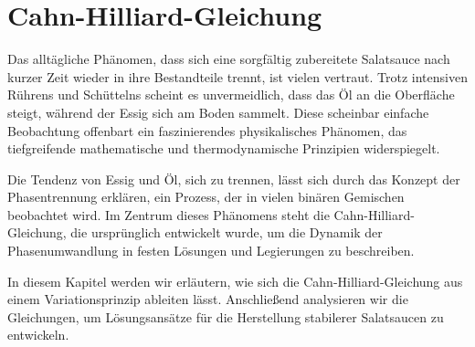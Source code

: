 %
%
%
%
\newcommand{\di}[2][]{\,\dd[#1]{#2}}
\newcommand{\deriv}[3][]{\frac{\dd[#1]{#2}}{\dd[]{#3^{#1}}}}
\newcommand{\pderiv}[3][]{\frac{\partial^{#1} #2}{\partial #3^{#1}}}
\newcommand{\energy}{\mathcal{E}}
\newcommand{\flux}{\mathcal{J}}

\chapter{Cahn-Hilliard-Gleichung\label{chapter:cahnhilliard}}
\begin{refsection}

Das alltägliche Phänomen,
dass sich eine sorgfältig zubereitete Salatsauce
nach kurzer Zeit wieder in ihre Bestandteile trennt,
ist vielen vertraut.
Trotz intensiven Rührens und Schüttelns scheint es unvermeidlich,
dass das Öl an die Oberfläche steigt,
während der Essig sich am Boden sammelt.
Diese scheinbar einfache Beobachtung offenbart ein faszinierendes physikalisches Phänomen,
das tiefgreifende mathematische und thermodynamische Prinzipien widerspiegelt.

Die Tendenz von Essig und Öl,
sich zu trennen,
lässt sich durch das Konzept der Phasentrennung erklären,
ein Prozess,
der in vielen binären Gemischen beobachtet wird.
Im Zentrum dieses Phänomens steht die Cahn-Hilliard-Gleichung,
die ursprünglich entwickelt wurde,
um die Dynamik der Phasenumwandlung in festen Lösungen und Legierungen zu beschreiben.

In diesem Kapitel werden wir erläutern,
wie sich die Cahn-Hilliard-Gleichung aus einem Variationsprinzip ableiten lässt.
Anschließend analysieren wir die Gleichungen,
um Lösungsansätze für die Herstellung stabilerer Salatsaucen zu entwickeln.





\printbibliography[heading=subbibliography]
\end{refsection}
